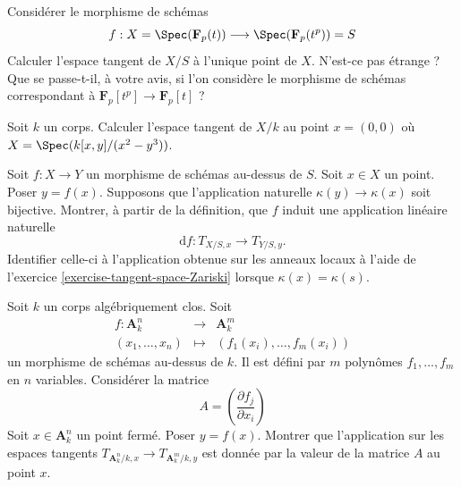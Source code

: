 \begin{exercise}
\label{exercise-compute-TS-field}
Considérer le morphisme de schémas
$$
f : X = \Spec(\mathbf{F}_p(t))
\longrightarrow
\Spec(\mathbf{F}_p(t^p)) = S
$$
Calculer l'espace tangent de $X/S$ à l'unique point de $X$.
N'est-ce pas étrange ? Que se passe-t-il, à votre avis, si l'on considère le morphisme
de schémas correspondant à $\mathbf{F}_p[t^p] \to \mathbf{F}_p[t]$ ?
\end{exercise}

\begin{exercise}
\label{exercise-compute-TS-cusp}
Soit $k$ un corps.
Calculer l'espace tangent de $X/k$ au point $x = (0, 0)$
où $X = \Spec(k[x, y]/(x^2 - y^3))$.
\end{exercise}

\begin{exercise}
\label{exercise-map-tangent-spaces}
Soit $f : X \to Y$ un morphisme de schémas au-dessus de $S$.
Soit $x \in X$ un point. Poser $y = f(x)$.
Supposons que l'application naturelle $\kappa(y) \to \kappa(x)$ soit
bijective. Montrer, à partir de la définition,
que $f$ induit une application linéaire naturelle
$$
\text{d}f : T_{X/S, x} \longrightarrow T_{Y/S, y}.
$$
Identifier celle-ci à l'application obtenue sur les anneaux locaux à l'aide de
l'exercice \ref{exercise-tangent-space-Zariski} lorsque $\kappa(x) = \kappa(s)$.
\end{exercise}

\begin{exercise}
\label{exercise-Jacobian}
Soit $k$ un corps algébriquement clos.
Soit
\begin{eqnarray*}
f : \mathbf{A}_k^n & \longrightarrow & \mathbf{A}^m_k \\
(x_1, \ldots, x_n) & \longmapsto & (f_1(x_i), \ldots, f_m(x_i))
\end{eqnarray*}
un morphisme de schémas au-dessus de $k$. Il est défini par
$m$ polynômes $f_1, \ldots, f_m$ en $n$ variables.
Considérer la matrice
$$
A = \left( \frac{\partial f_j}{\partial x_i} \right)
$$
Soit $x \in \mathbf{A}^n_k$ un point fermé.
Poser $y =  f(x)$. Montrer que l'application sur les espaces tangents
$T_{\mathbf{A}^n_k/k, x} \to T_{\mathbf{A}^m_k/k, y}$
est donnée par la valeur de la matrice $A$ au point $x$.
\end{exercise}














